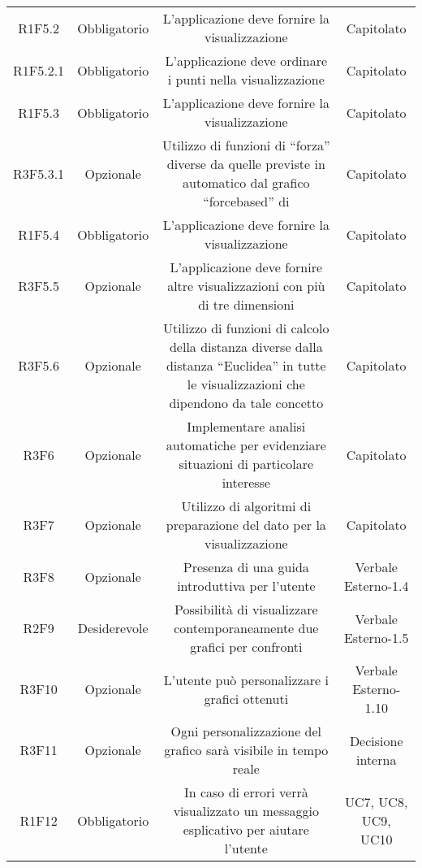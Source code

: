 \begin{center}
\begin{longtable}{C{\colA} C{\colB} C{\colC} C{\colA}}
R1F5.2 & Obbligatorio & L'applicazione deve fornire la visualizzazione  & Capitolato\\
R1F5.2.1 & Obbligatorio & L'applicazione deve ordinare i punti nella visualizzazione  & Capitolato \\
R1F5.3 & Obbligatorio & L'applicazione deve fornire la visualizzazione  & Capitolato\\
R3F5.3.1 & Opzionale & Utilizzo di funzioni di “forza” diverse da quelle previste in automatico dal grafico “forcebased” di  & Capitolato\\
R1F5.4 & Obbligatorio & L'applicazione deve fornire la visualizzazione  & Capitolato \\
R3F5.5 & Opzionale & L'applicazione deve fornire altre visualizzazioni con più di tre dimensioni & Capitolato\\
R3F5.6 & Opzionale & Utilizzo di funzioni di calcolo della distanza diverse dalla distanza “Euclidea” in tutte le visualizzazioni che dipendono da tale concetto & Capitolato \\
R3F6 & Opzionale & Implementare analisi automatiche per evidenziare situazioni di particolare interesse & Capitolato\\
R3F7 & Opzionale & Utilizzo di algoritmi di preparazione del dato per la visualizzazione & Capitolato\\
R3F8 & Opzionale & Presenza di una guida introduttiva per l'utente & Verbale Esterno-1.4\\
R2F9 & Desiderevole & Possibilità di visualizzare contemporaneamente due grafici per confronti & Verbale Esterno-1.5\\
R3F10 & Opzionale & L'utente può personalizzare i grafici ottenuti & Verbale Esterno-1.10 \\
R3F11 & Opzionale & Ogni personalizzazione del grafico sarà visibile in tempo reale & Decisione interna \\
R1F12 & Obbligatorio & In caso di errori verrà visualizzato un messaggio esplicativo per aiutare l'utente & UC7, UC8, UC9, UC10\\

\end{longtable}
\end{center}



